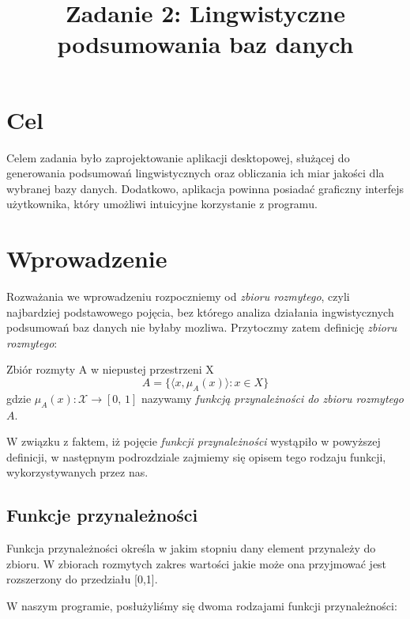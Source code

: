 \documentclass{classrep}
\author{
\studentinfo{Mateusz Walczak}{216911} \and
\studentinfo{Konrad Kajszczak}{216790}
}
\title{Zadanie 2: Lingwistyczne podsumowania baz danych}
\begin{document}
\maketitle

\section{Cel}
Celem zadania było zaprojektowanie aplikacji desktopowej, służącej do generowania podsumowań lingwistycznych oraz obliczania ich miar jakości dla wybranej bazy danych. Dodatkowo, aplikacja powinna posiadać graficzny interfejs użytkownika, który umożliwi intuicyjne korzystanie z programu.


\section{Wprowadzenie}
Rozważania we wprowadzeniu rozpoczniemy od \emph{zbioru rozmytego}, czyli najbardziej podstawowego pojęcia, bez którego analiza działania ingwistycznych podsumowań baz danych nie byłaby mozliwa. Przytoczmy zatem definicję \emph{zbioru rozmytego}:

\begin{definition}
Zbiór rozmyty A w niepustej przestrzeni X \cite{zadech}
\[A = \{\langle x, \mu_A(x)\rangle: x \in X \} \]
gdzie \(\mu_A(x) : \mathcal{X} \to [0,\,1]\) nazywamy \emph{funkcją
przynależności do zbioru rozmytego \(A\)}.
\end{definition}

W związku z faktem, iż pojęcie \emph{funkcji przynależności} wystąpiło w powyższej definicji, w następnym podrozdziale zajmiemy się opisem tego rodzaju funkcji, wykorzystywanych przez nas.



\subsection{Funkcje przynależności}

Funkcja przynależności określa w jakim stopniu dany element przynależy do zbioru. W zbiorach rozmytych zakres wartości jakie może ona przyjmować jest rozszerzony do przedziału [0,1]. \newline

W naszym programie, posłużyliśmy się dwoma rodzajami funkcji przynależności:
\end{document}
